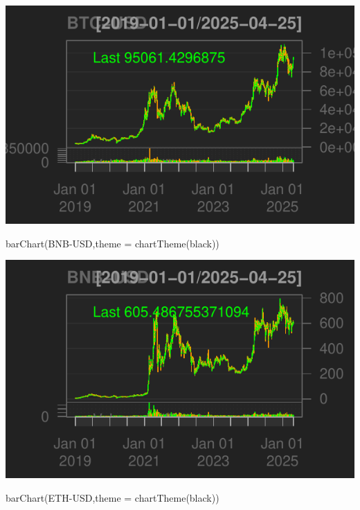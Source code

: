 \documentclass[]{tufte-handout}
\newenvironment{Shaded}{}{}
\newcommand{\AttributeTok}[1]{\textcolor[rgb]{0.49,0.56,0.16}{#1}}
\newcommand{\FunctionTok}[1]{\textcolor[rgb]{0.02,0.16,0.49}{#1}}
\newcommand{\NormalTok}[1]{#1}
\newcommand{\StringTok}[1]{\textcolor[rgb]{0.25,0.44,0.63}{#1}}
\begin{document}
\includegraphics{cripto_update_files/figure-latex/unnamed-chunk-3-1}

\begin{Shaded}
\begin{Highlighting}[]
\FunctionTok{barChart}\NormalTok{(}\StringTok{\textasciigrave{}}\AttributeTok{BNB{-}USD}\StringTok{\textasciigrave{}}\NormalTok{,}\AttributeTok{theme =} \FunctionTok{chartTheme}\NormalTok{(}\StringTok{\textquotesingle{}black\textquotesingle{}}\NormalTok{))}
\end{Highlighting}
\end{Shaded}

\includegraphics{cripto_update_files/figure-latex/unnamed-chunk-3-2}

\begin{Shaded}
\begin{Highlighting}[]
\FunctionTok{barChart}\NormalTok{(}\StringTok{\textasciigrave{}}\AttributeTok{ETH{-}USD}\StringTok{\textasciigrave{}}\NormalTok{,}\AttributeTok{theme =} \FunctionTok{chartTheme}\NormalTok{(}\StringTok{\textquotesingle{}black\textquotesingle{}}\NormalTok{))}
\end{Highlighting}
\end{Shaded}
\end{document}
